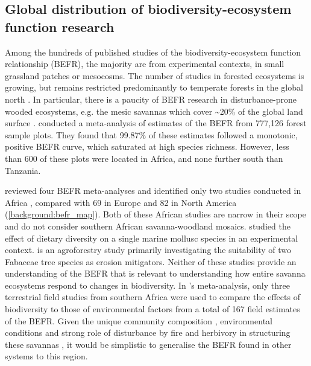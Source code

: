 \begin{refsection}
\subsection{Global distribution of biodiversity-ecosystem function research}
\label{background:ssec:befr_global}

Among the hundreds of published studies of the biodiversity-ecosystem function relationship (BEFR), the majority are from experimental contexts, in small grassland patches or mesocosms. The number of studies in forested ecosystems is growing, but remains restricted predominantly to temperate forests in the global north \citep{Clarke2017}. In particular, there is a paucity of BEFR research in disturbance-prone wooded ecosystems, e.g. the mesic savannas which cover \textasciitilde{}20\% of the global land surface \citep{Scholes1993}. \citet{Liang2016} conducted a meta-analysis of estimates of the BEFR from 777,126 forest sample plots. They found that 99.87\% of these estimates followed a monotonic, positive BEFR curve, which saturated at high species richness. However, less than 600 of these plots were located in Africa, and none further south than Tanzania. 

\citet{Clarke2017} reviewed four BEFR meta-analyses \citep{Gamfeldt2015, Griffin2013a, Zhang2012, Cardinale2009} and identified only two studies conducted in Africa \citep{Foster1999, Burleigh1997}, compared with 69 in Europe and 82 in North America (\autoref{background:befr_map}). Both of these African studies are narrow in their scope and do not consider southern African savanna-woodland mosaics. \citet{Foster1999} studied the effect of dietary diversity on a single marine mollusc species in an experimental context. \citet{Burleigh1997} is an agroforestry study primarily investigating the suitability of two Fabaceae tree species as erosion mitigators. Neither of these studies provide an understanding of the BEFR that is relevant to understanding how entire savanna ecosystems respond to changes in biodiversity. In \citeauthor{Duffy2017}'s \citeyearpar{Duffy2017} meta-analysis, only three terrestrial field studies from southern Africa were used to compare the effects of biodiversity to those of environmental factors from a total of 167 field estimates of the BEFR. Given the unique community composition \citep{Lehmann2011}, environmental conditions \citep{Linder2003} and strong role of disturbance by fire and herbivory in structuring these savannas \citep{Staver2011}, it would be simplistic to generalise the BEFR found in other systems to this region.


\end{refsection}
